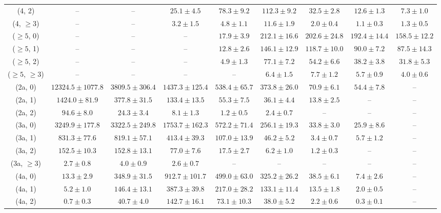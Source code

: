 \begin{table}[h!]
{\begin{tabular}{ccccccccc}
	(4, 2) & -- & -- & $25.1\pm 4.5$ & $78.3\pm 9.2$ & $112.3\pm 9.2$ & $32.5\pm 2.8$ & $12.6\pm 1.3$ & $7.3\pm 1.0$ \\[0.5ex] 
	(4, $\ge3$) & -- & -- & $3.2\pm 1.5$ & $4.8\pm 1.1$ & $11.6\pm 1.9$ & $2.0\pm 0.4$ & $1.1\pm 0.3$ & $1.3\pm 0.5$ \\[0.5ex] 
	($\ge5$, 0) & -- & -- & -- & $17.9\pm 3.9$ & $212.1\pm 16.6$ & $202.6\pm 24.8$ & $192.4\pm 14.4$ & $158.5\pm 12.2$ \\[0.5ex] 
	($\ge5$, 1) & -- & -- & -- & $12.8\pm 2.6$ & $146.1\pm 12.9$ & $118.7\pm 10.0$ & $90.0\pm 7.2$ & $87.5\pm 14.3$ \\[0.5ex] 
	($\ge5$, 2) & -- & -- & -- & $4.9\pm 1.3$ & $77.1\pm 7.2$ & $54.2\pm 6.6$ & $38.2\pm 3.8$ & $31.8\pm 5.3$ \\[0.5ex] 
	($\ge5$, $\ge3$) & -- & -- & -- & -- & $6.4\pm 1.5$ & $7.7\pm 1.2$ & $5.7\pm 0.9$ & $4.0\pm 0.6$ \\[0.5ex] 
	(2a, 0) & $12324.5\pm 1077.8$ & $3809.5\pm 306.4$ & $1437.3\pm 125.4$ & $538.4\pm 65.7$ & $373.8\pm 26.0$ & $70.9\pm 6.1$ & $54.4\pm 7.8$ & -- \\[0.5ex] 
	(2a, 1) & $1424.0\pm 81.9$ & $377.8\pm 31.5$ & $133.4\pm 13.5$ & $55.3\pm 7.5$ & $36.1\pm 4.4$ & $13.8\pm 2.5$ & -- & -- \\[0.5ex] 
	(2a, 2) & $94.6\pm 8.0$ & $24.3\pm 3.4$ & $8.1\pm 1.3$ & $1.2\pm 0.5$ & $2.4\pm 0.7$ & -- & -- & -- \\[0.5ex] 
	(3a, 0) & $3249.9\pm 177.8$ & $3322.5\pm 249.8$ & $1753.7\pm 162.3$ & $572.2\pm 71.4$ & $256.1\pm 19.3$ & $33.8\pm 3.0$ & $25.9\pm 8.6$ & -- \\[0.5ex] 
	(3a, 1) & $831.3\pm 77.6$ & $819.1\pm 57.1$ & $413.4\pm 39.3$ & $107.0\pm 13.9$ & $46.2\pm 5.2$ & $3.4\pm 0.7$ & $5.7\pm 1.2$ & -- \\[0.5ex] 
	(3a, 2) & $152.5\pm 10.3$ & $152.8\pm 13.1$ & $77.0\pm 7.6$ & $17.5\pm 2.7$ & $6.2\pm 1.0$ & $1.2\pm 0.3$ & -- & -- \\[0.5ex] 
	(3a, $\ge3$) & $2.7\pm 0.8$ & $4.0\pm 0.9$ & $2.6\pm 0.7$ & -- & -- & -- & -- & -- \\[0.5ex] 
	(4a, 0) & $13.3\pm 2.9$ & $348.9\pm 31.5$ & $912.7\pm 101.7$ & $499.0\pm 63.0$ & $325.2\pm 26.2$ & $38.5\pm 6.1$ & $7.4\pm 2.6$ & -- \\[0.5ex] 
	(4a, 1) & $5.2\pm 1.0$ & $146.4\pm 13.1$ & $387.3\pm 39.8$ & $217.0\pm 28.2$ & $133.1\pm 11.4$ & $13.5\pm 1.8$ & $2.0\pm 0.5$ & -- \\[0.5ex] 
	(4a, 2) & $0.7\pm 0.3$ & $40.7\pm 4.0$ & $142.7\pm 16.1$ & $73.1\pm 10.3$ & $38.0\pm 5.2$ & $2.2\pm 0.6$ & $0.3\pm 0.1$ & -- \\[0.5ex] 

\end{tabular}}
\end{table}
